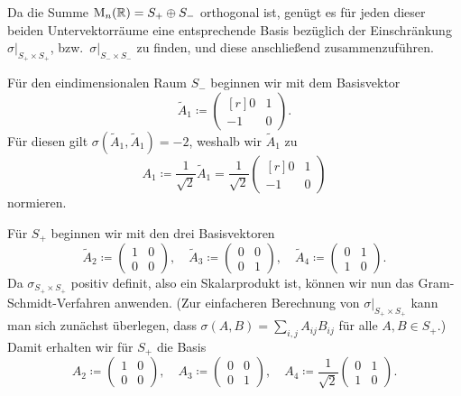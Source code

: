 \documentclass[a4paper, 10pt]{scrartcl}
\begin{document}
\begin{solution}
\begin{enumerate}[leftmargin=*]
      Da die Summe $\mathrm{M}_n(\mathbb{R}) = S_+ \oplus S_-$ orthogonal ist, genügt es für jeden dieser beiden Untervektorräume eine entsprechende Basis bezüglich der Einschränkung $\sigma|_{S_+ \times S_+}$, bzw.\ $\sigma|_{S_- \times S_-}$ zu finden, und diese anschließend zusammenzuführen.
      
      Für den eindimensionalen Raum $S_-$ beginnen wir mit dem Basisvektor
      \[
        \tilde{A}_1
        \coloneqq
        \begin{pmatrix*}[r]
           0  & 1 \\
          -1  & 0
        \end{pmatrix*}.
      \]
      Für diesen gilt $\sigma(\tilde{A}_1, \tilde{A}_1) = -2$, weshalb wir $\tilde{A}_1$ zu
      \[
        A_1
        \coloneqq
        \frac{1}{\sqrt{2}}
        \tilde{A}_1
        =
        \frac{1}{\sqrt{2}}
        \begin{pmatrix*}[r]
           0  & 1 \\
          -1  & 0
        \end{pmatrix*}
      \]
      normieren.
      
      Für $S_+$ beginnen wir mit den drei Basisvektoren
      \[
        \tilde{A}_2
        \coloneqq
        \begin{pmatrix}
          1 & 0 \\
          0 & 0
        \end{pmatrix},
        \quad
        \tilde{A}_3
        \coloneqq
        \begin{pmatrix}
          0 & 0 \\
          0 & 1
        \end{pmatrix},
        \quad
        \tilde{A}_4
        \coloneqq
        \begin{pmatrix}
          0 & 1 \\
          1 & 0
        \end{pmatrix}.
      \]
      Da $\sigma_{S_+ \times S_+}$ positiv definit, also ein Skalarprodukt ist, können wir nun das Gram-Schmidt-Verfahren anwenden.
      (Zur einfacheren Berechnung von $\sigma|_{S_+ \times S_+}$ kann man sich zunächst überlegen, dass $\sigma(A, B) = \sum_{i,j} A_{ij} B_{ij}$ für alle $A, B \in S_+$.)
      Damit erhalten wir für $S_+$ die Basis
      \[
        A_2
        \coloneqq
        \begin{pmatrix}
          1 & 0 \\
          0 & 0
        \end{pmatrix},
        \quad
        A_3
        \coloneqq
        \begin{pmatrix}
          0 & 0 \\
          0 & 1
        \end{pmatrix},
        \quad
        A_4
        \coloneqq
        \frac{1}{\sqrt{2}}
        \begin{pmatrix}
          0 & 1 \\
          1 & 0
        \end{pmatrix}.
      \]
      

\end{enumerate}
\end{solution}
\end{document}
